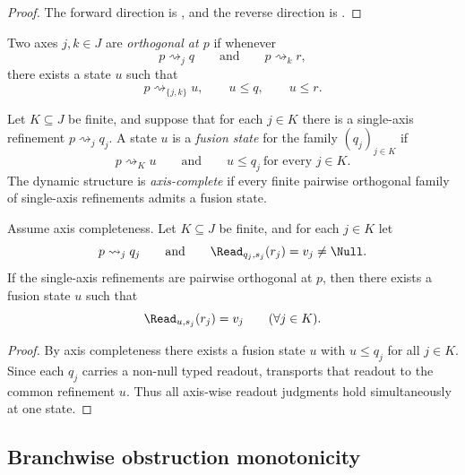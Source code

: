\begin{proof}
The forward direction is , and the reverse direction is .
\end{proof}

\begin{definition}[Orthogonality]\label{def:axis-orthogonality}
Two axes $j,k\in J$ are \emph{orthogonal at $p$} if whenever
\[
p\rightsquigarrow_j q
\qquad\text{and}\qquad
p\rightsquigarrow_k r,
\]
there exists a state $u$ such that
\[
p\rightsquigarrow_{\{j,k\}} u,
\qquad
u\le q,
\qquad
u\le r.
\]
\end{definition}

\begin{definition}\label{def:fusion-state}
Let $K\subseteq J$ be finite, and suppose that for each $j\in K$ there is a single-axis refinement $p\rightsquigarrow_j q_j$. A state $u$ is a \emph{fusion state} for the family $(q_j)_{j\in K}$ if
\[
p\rightsquigarrow_K u
\qquad\text{and}\qquad
u\le q_j\ \text{for every }j\in K.
\]
The dynamic structure is \emph{axis-complete} if every finite pairwise orthogonal family of single-axis refinements admits a fusion state.
\end{definition}

\begin{corollary}\label{cor:explicit-lifting}
Assume axis completeness. Let $K\subseteq J$ be finite, and for each $j\in K$ let
\[
p\rightsquigarrow_j q_j
\qquad\text{and}\qquad
\Read_{q_j,s_j}(r_j)=v_j\neq \Null.
\]
If the single-axis refinements are pairwise orthogonal at $p$, then there exists a fusion state $u$ such that
\[
\Read_{u,s_j}(r_j)=v_j
\qquad
(\forall j\in K).
\]
\end{corollary}

\begin{proof}
By axis completeness there exists a fusion state $u$ with $u\le q_j$ for all $j\in K$. Since each $q_j$ carries a non-null typed readout,  transports that readout to the common refinement $u$. Thus all axis-wise readout judgments hold simultaneously at one state.
\end{proof}

\subsection{Branchwise obstruction monotonicity}

